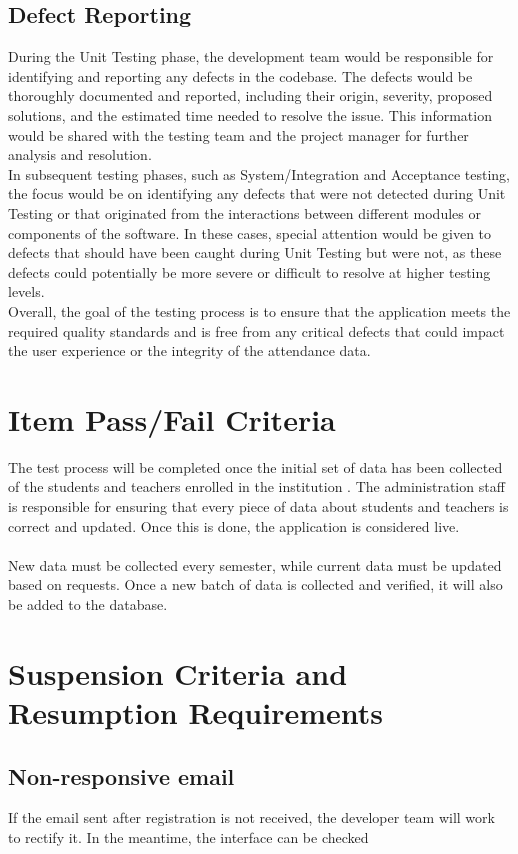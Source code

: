 \documentclass{scrreprt}
\begin{document}
\section{Defect Reporting}
During the Unit Testing phase, the development team would be responsible for identifying and reporting any defects in the codebase. The defects would be thoroughly documented and reported, including their origin, severity, proposed solutions, and the estimated time needed to resolve the issue. This information would be shared with the testing team and the project manager for further analysis and resolution.\\
In subsequent testing phases, such as System/Integration and Acceptance testing, the focus would be on identifying any defects that were not detected during Unit Testing or that originated from the interactions between different modules or components of the software. In these cases, special attention would be given to defects that should have been caught during Unit Testing but were not, as these defects could potentially be more severe or difficult to resolve at higher testing levels.\\ 
Overall, the goal of the testing process is to ensure that the application meets the required quality standards and is free from any critical defects that could impact the user experience or the integrity of the attendance data.

\chapter{Item Pass/Fail Criteria}
The test process will be completed once the initial set of data has been collected of the students and teachers enrolled in the institution . The administration staff is responsible for ensuring that every piece of data about students and teachers is correct and updated. Once this is done, the application is considered live. \\\\
New data must be collected every semester, while current data must be updated based on requests. Once a new batch of data is collected and verified, it will also be added to the database.

\chapter{Suspension Criteria and Resumption Requirements}
\section{Non-responsive email}
If the email sent after registration is not received, the developer team will work to rectify it. In the meantime, the interface can be checked
\end{document}
